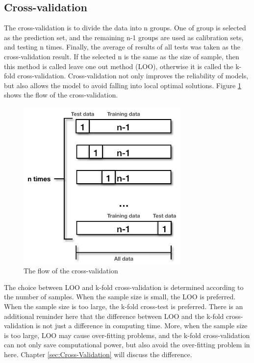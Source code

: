 \documentclass[a4paper,12pt,titlepage]{article} %
\numberwithin{equation}{section}  %
\begin{document}
	\subsection{Cross-validation}
	\label{cross-validation}
	The cross-validation is to divide the data into n groups. One of group is selected as the prediction set, and the remaining n-1 groups are used as calibration sets, and testing n times. Finally, the average of results of all tests was taken as the cross-validation result. If the selected n is the same as the size of sample, then this method is called leave one out method (LOO), otherwise it is called the k-fold cross-validation. Cross-validation not only improves the reliability of models, but also allows the model to avoid falling into local optimal solutions. Figure \ref{fig:cross-validation} shows the flow of the cross-validation.
	\begin{figure}[h]    %
		\centering           %
		\includegraphics[width=8.5cm, angle=0]{cross-validation.png}  %
		\vspace*{-0.25cm}    %
		\caption{The flow of the cross-validation}          %
		\label{fig:cross-validation}               %
	\end{figure}                        %
	
	The choice between LOO and k-fold cross-validation is determined according to the number of samples. When the sample size is small, the LOO is preferred. When the sample size is too large, the k-fold cross-test is preferred. There is an additional reminder here that the difference between LOO and the k-fold cross-validation is not just a difference in computing time. More, when the sample size is too large, LOO may cause over-fitting problems, and the k-fold cross-validation can not only save computational power, but also avoid the over-fitting problem in here. Chapter \ref{sec:Cross-Validation} will discuss the difference.
	
\end{document}
